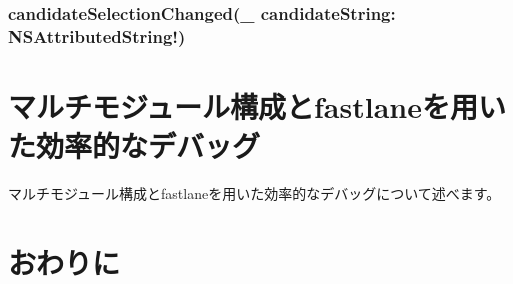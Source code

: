 \documentclass[uplatex,a4j,12pt,twocolumn]{jsarticle}
\begin{document}
\subsubsection{candidateSelectionChanged(\_ candidateString: NSAttributedString!)}


\section{マルチモジュール構成とfastlaneを用いた効率的なデバッグ}\label{sec:multi_module_and_fastlane}
マルチモジュール構成とfastlaneを用いた効率的なデバッグについて述べます。

\section{おわりに}\label{sec:conclusion}

 
 
\end{document}
